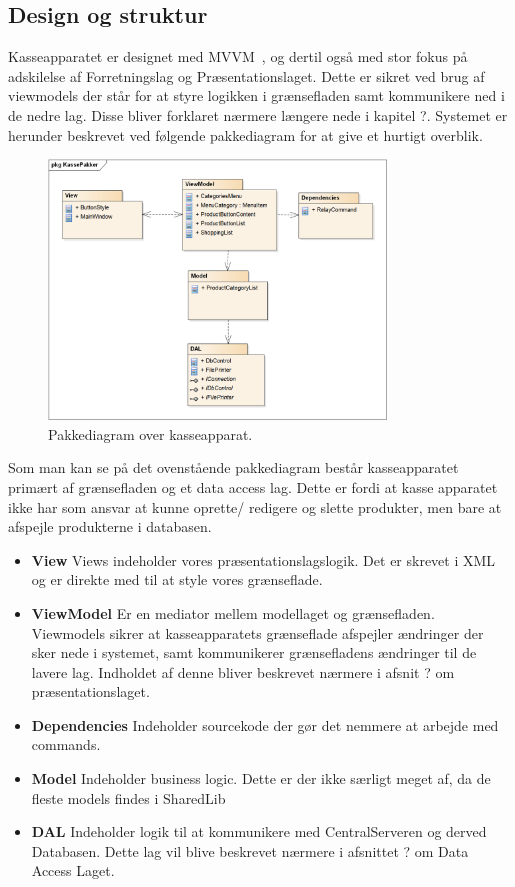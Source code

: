 \subsection{Design og struktur}
Kasseapparatet er designet med MVVM~\cite{MVVM}, og dertil også med stor fokus på adskilelse af Forretningslag og Præsentationslaget. Dette er sikret ved brug af viewmodels der står for at styre logikken i grænsefladen samt kommunikere ned i de nedre lag. Disse bliver forklaret nærmere længere nede i kapitel ?.
Systemet er herunder beskrevet ved følgende pakkediagram for at give et hurtigt overblik.	

\begin{figure}[H]
	\centering
	\includegraphics[width=0.8\textwidth]{Systemdesign/Frontend/pics/KassePakker}
	\caption{Pakkediagram over kasseapparat.}
	\label{fig:EndeligeGUI}
\end{figure}

Som man kan se på det ovenstående pakkediagram består kasseapparatet primært af grænsefladen og et data access lag. Dette er fordi at kasse apparatet ikke har som ansvar at kunne oprette/ redigere og slette produkter, men bare at afspejle produkterne i databasen. 

\begin{itemize}
	\item \textbf{View} Views indeholder vores præsentationslagslogik. Det er skrevet i XML og er direkte med til at style vores grænseflade.
	\item \textbf{ViewModel} Er en mediator mellem modellaget og grænsefladen. Viewmodels sikrer at kasseapparatets grænseflade afspejler ændringer der sker nede i systemet, samt kommunikerer grænsefladens ændringer til de lavere lag. Indholdet af denne bliver beskrevet nærmere i afsnit ? om præsentationslaget.
	\item \textbf{Dependencies} Indeholder sourcekode der gør det nemmere at arbejde med commands.
	\item \textbf{Model} Indeholder business logic. Dette er der ikke særligt meget af, da de fleste models findes i SharedLib
	\item \textbf{DAL} Indeholder logik til at kommunikere med CentralServeren og derved Databasen. Dette lag vil blive beskrevet nærmere i afsnittet ? om Data Access Laget.
\end{itemize}



